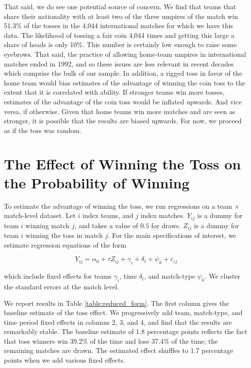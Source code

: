 \documentclass[12pt, letterpaper]{article}
\begin{document}
That said, we do see one potential source of concern. We find that teams that share their nationality with at least two of the three umpires of the match win 51.3\% of the tosses in the 4,044 international matches for which we have this data. The likelihood of tossing a fair coin 4,044 times and getting this large a share of heads is only 10\%. This number is certainly low enough to raise some eyebrows. That said, the practice of allowing home-team umpires in international matches ended in 1992, and so these issues are less relevant in recent decades which comprise the bulk of our sample. In addition, a rigged toss in favor of the home team would bias estimates of the advantage of winning the coin toss to the extent that it is correlated with ability. If stronger teams win more tosses, estimates of the advantage of the coin toss would be inflated upwards. And vice versa, if otherwise. Given that home teams win more matches and are seen as stronger, it is possible that the results are biased upwards. For now, we proceed as if the toss was random.

\section{The Effect of Winning the Toss on the Probability of Winning}

To estimate the advantage of winning the toss, we run regressions on a team $\times$ match-level dataset. Let $i$ index teams, and $j$ index matches. $Y_{ij}$ is a dummy for team $i$ winning match $j$, and takes a value of $0.5$ for draws. $Z_{ij}$ is a dummy for team $i$ winning the toss in match $j$. For the main specifications of interest, we estimate regression equations of the form

\begin{equation}\label{eqn:reduced_form}
Y_{ij} = \alpha_0 + \tau Z_{ij} + \gamma_i + \delta_t + \psi_k + \varepsilon_{ij}
\end{equation}

which include fixed effects for teams $\gamma_i$, time $\delta_t$, and match-type $\psi_k$. We cluster the standard errors at the match level.

We report results in Table \ref{table:reduced_form}. The first column gives the baseline estimate of the toss effect. We progressively add team, match-type, and time period fixed effects in columns 2, 3, and 4, and find that the results are remarkably stable. The baseline estimate of 1.8 percentage points reflects the fact that toss winners win 39.2\% of the time and lose 37.4\% of the time; the remaining matches are drawn. The estimated effect shuffles to 1.7 percentage points when we add various fixed effects.
\end{document}

